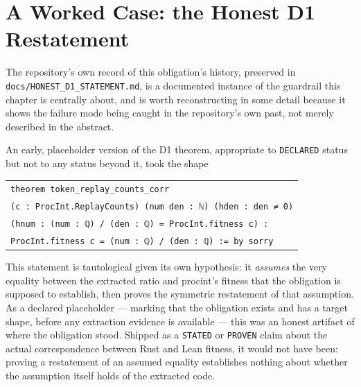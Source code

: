 \section{A Worked Case: the Honest D1 Restatement}
\label{sec:correspondence-d1-history}

The repository's own record of this obligation's history, preserved in
\texttt{docs/HONEST\_D1\_STATEMENT.md}, is a documented instance of the
guardrail this chapter is centrally about, and is worth reconstructing in
some detail because it shows the failure mode being caught in the
repository's own past, not merely described in the abstract.

An early, placeholder version of the D1 theorem, appropriate to
\texttt{DECLARED} status but not to any status beyond it, took the shape
\begin{center}
\small
\begin{tabular}{l}
\texttt{theorem token\_replay\_counts\_corr}\\
\texttt{\quad(c : ProcInt.ReplayCounts) (num den : ℕ) (hden : den ≠ 0)}\\
\texttt{\quad(hnum : (num : ℚ) / (den : ℚ) = ProcInt.fitness c) :}\\
\texttt{\quad ProcInt.fitness c = (num : ℚ) / (den : ℚ) := by sorry}
\end{tabular}
\end{center}
This statement is tautological given its own hypothesis: it \emph{assumes}
the very equality between the extracted ratio and \textsf{procint}'s
fitness that the obligation is supposed to establish, then proves the
symmetric restatement of that assumption. As a declared placeholder ---
marking that the obligation exists and has a target shape, before any
extraction evidence is available --- this was an honest artifact of where
the obligation stood. Shipped as a \texttt{STATED} or \texttt{PROVEN}
claim about the actual correspondence between Rust and Lean fitness, it
would not have been: proving a restatement of an assumed equality
establishes nothing about whether the assumption itself holds of the
extracted code.

